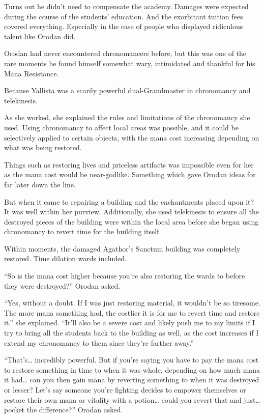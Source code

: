 \documentclass[a4paper,10pt]{book}
\begin{document}
\par
Turns out he didn’t need to compensate the academy. Damages were expected during the course of the students’ education. And the exorbitant tuition fees covered everything. Especially in the case of people who displayed ridiculous talent like Orodan did.\par
Orodan had never encountered chronomancers before, but this was one of the rare moments he found himself somewhat wary, intimidated and thankful for his Mana Resistance.\par
Because Yallista was a scarily powerful dual-Grandmaster in chronomancy and telekinesis.\par
As she worked, she explained the rules and limitations of the chronomancy she used. Using chronomancy to affect local areas was possible, and it could be selectively applied to certain objects, with the mana cost increasing depending on what was being restored.\par
Things such as restoring lives and priceless artifacts was impossible even for her as the mana cost would be near-godlike. Something which gave Orodan ideas for far later down the line.\par
But when it came to repairing a building and the enchantments placed upon it? It was well within her purview. Additionally, she used telekinesis to ensure all the destroyed pieces of the building were within the local area before she began using chronomancy to revert time for the building itself.\par
Within moments, the damaged Agathor’s Sanctum building was completely restored. Time dilation wards included.\par
“So is the mana cost higher because you’re also restoring the wards to before they were destroyed?” Orodan asked.\par
“Yes, without a doubt. If I was just restoring material, it wouldn’t be so tiresome. The more mana something had, the costlier it is for me to revert time and restore it.” she explained. “It’ll also be a severe cost and likely push me to my limits if I try to bring all the students back to the building as well, as the cost increases if I extend my chronomancy to them since they’re farther away.”\par
“That’s… incredibly powerful. But if you’re saying you have to pay the mana cost to restore something in time to when it was whole, depending on how much mana it had… can you then gain mana by reverting something to when it was destroyed or lesser? Let’s say someone you’re fighting decides to empower themselves or restore their own mana or vitality with a potion… could you revert that and just… pocket the difference?” Orodan asked.\par
\end{document}
